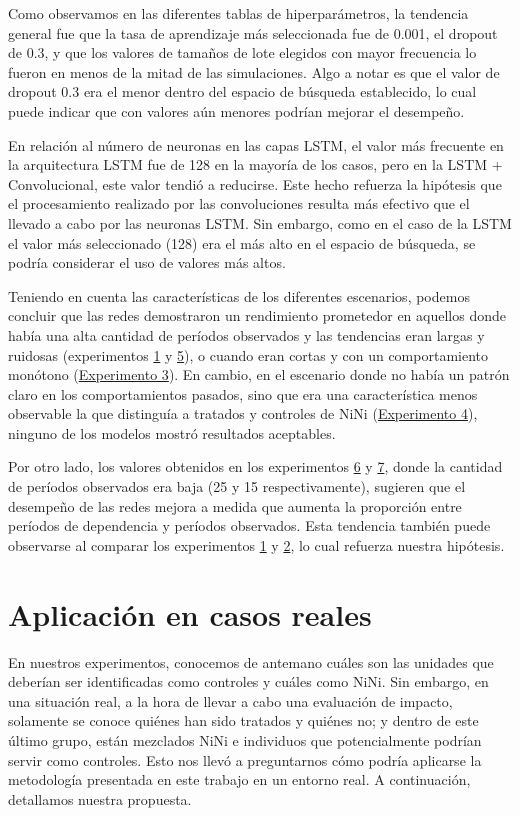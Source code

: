 \documentclass[../main.tex]{subfiles}
\begin{document}
Como observamos en las diferentes tablas de hiperparámetros, la tendencia general fue que
la tasa de aprendizaje más seleccionada fue de 0.001, el dropout de 0.3, y que los valores
de tamaños de lote elegidos con mayor frecuencia lo fueron en menos de la mitad de las
simulaciones. Algo a notar es que el valor de dropout 0.3 era el menor dentro del espacio
de búsqueda establecido, lo cual puede indicar que con valores aún menores podrían mejorar
el desempeño.

En relación al número de neuronas en las capas LSTM, el valor más frecuente en la
arquitectura LSTM fue de 128 en la mayoría de los casos, pero en la LSTM + Convolucional,
este valor tendió a reducirse. Este hecho refuerza la hipótesis que el procesamiento
realizado por las convoluciones resulta más efectivo que el llevado a cabo por las
neuronas LSTM. Sin embargo, como en el caso de la LSTM el valor más seleccionado (128) era
el más alto en el espacio de búsqueda, se podría considerar el uso de valores más altos.

Teniendo en cuenta las características de los diferentes escenarios, podemos concluir que
las redes demostraron un rendimiento prometedor en aquellos donde había una alta cantidad
de períodos observados y las tendencias eran largas y ruidosas (experimentos
\hyperref[sec:exp1]{1} y \hyperref[sec:exp5]{5}), o cuando eran cortas y con un
comportamiento monótono (\hyperref[sec:exp3]{Experimento 3}). En cambio, en el escenario
donde no había un patrón claro en los comportamientos pasados, sino que era una
característica menos observable la que distinguía a tratados y controles de NiNi
(\hyperref[sec:exp4]{Experimento 4}), ninguno de los modelos mostró resultados aceptables.

Por otro lado, los valores obtenidos en los experimentos \hyperref[sec:exp6]{6} y
\hyperref[sec:exp7]{7}, donde la cantidad de períodos observados era baja (25 y 15
respectivamente), sugieren que el desempeño de las redes mejora a medida que aumenta la
proporción entre períodos de dependencia y períodos observados. Esta tendencia también
puede observarse al comparar los experimentos \hyperref[sec:exp1]{1} y
\hyperref[sec:exp2]{2}, lo cual refuerza nuestra hipótesis.

\section{Aplicación en casos reales}
En nuestros experimentos, conocemos de antemano cuáles son las unidades que deberían ser
identificadas como controles y cuáles como NiNi. Sin embargo, en una situación real, a la
hora de llevar a cabo una evaluación de impacto, solamente se conoce quiénes han sido
tratados y quiénes no; y dentro de este último grupo, están mezclados NiNi e individuos
que potencialmente podrían servir como controles. Esto nos llevó a preguntarnos cómo
podría aplicarse la metodología presentada en este trabajo en un entorno real. A
continuación, detallamos nuestra propuesta.
\end{document}
